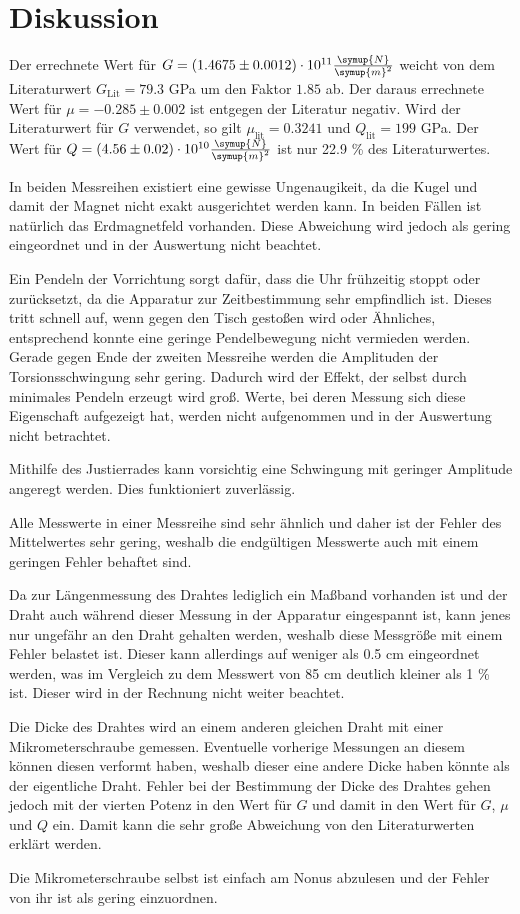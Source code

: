 \section{Diskussion}
\label{sec:Diskussion}

Der errechnete Wert für $G = (1.4675 \pm 0.0012) \cdot 10^{11} \frac{\symup{N}}{\symup{m}^2}$ weicht von dem Literaturwert $G_\text{Lit} = 79.3$ GPa \cite{G-stahl} um den Faktor $1.85$ ab.
Der daraus errechnete Wert für $\mu = -0.285 \pm 0.002$ ist entgegen der Literatur negativ.
Wird der Literaturwert für $G$ verwendet, so gilt $\mu_\text{lit} = 0.3241$ und $Q_\text{lit} = 199$ GPa.
Der Wert für $Q = (4.56 \pm 0.02) \cdot 10^{10} \frac{\symup{N}}{\symup{m}^2}$ ist nur 22.9 \% des Literaturwertes.

In beiden Messreihen existiert eine gewisse Ungenaugikeit, da die Kugel und damit der Magnet nicht exakt ausgerichtet werden kann.
In beiden Fällen ist natürlich das Erdmagnetfeld vorhanden. Diese Abweichung wird jedoch als gering eingeordnet und in der Auswertung nicht beachtet.

Ein Pendeln der Vorrichtung sorgt dafür, dass die Uhr frühzeitig stoppt oder zurücksetzt, da die Apparatur zur Zeitbestimmung sehr empfindlich ist. Dieses tritt schnell auf, wenn gegen den Tisch gestoßen wird oder Ähnliches, entsprechend konnte eine geringe Pendelbewegung nicht vermieden werden.
Gerade gegen Ende der zweiten Messreihe werden die Amplituden der Torsionsschwingung sehr gering. Dadurch wird der Effekt, der selbst durch minimales Pendeln erzeugt wird groß.
Werte, bei deren Messung sich diese Eigenschaft aufgezeigt hat, werden nicht aufgenommen und in der Auswertung nicht betrachtet.

Mithilfe des Justierrades kann vorsichtig eine Schwingung mit geringer Amplitude angeregt werden. Dies funktioniert zuverlässig.

Alle Messwerte in einer Messreihe sind sehr ähnlich und daher ist der Fehler des Mittelwertes sehr gering, weshalb die endgültigen Messwerte auch mit einem geringen Fehler behaftet sind.

Da zur Längenmessung des Drahtes lediglich ein Maßband vorhanden ist und der Draht auch während dieser Messung in der Apparatur eingespannt ist, kann jenes nur ungefähr an den Draht gehalten werden, weshalb diese Messgröße mit einem Fehler belastet ist.
Dieser kann allerdings auf weniger als 0.5 cm eingeordnet werden, was im Vergleich zu dem Messwert von 85 cm deutlich kleiner als 1 \% ist. Dieser wird in der Rechnung nicht weiter beachtet.

Die Dicke des Drahtes wird an einem anderen gleichen Draht mit einer Mikrometerschraube gemessen. 
Eventuelle vorherige Messungen an diesem können diesen verformt haben, weshalb dieser eine andere Dicke haben könnte als der eigentliche Draht.
Fehler bei der Bestimmung der Dicke des Drahtes gehen jedoch mit der vierten Potenz in den Wert für $G$ und damit in den Wert für $G$, $\mu$ und $Q$ ein.
Damit kann die sehr große Abweichung von den Literaturwerten erklärt werden.

Die Mikrometerschraube selbst ist einfach am Nonus abzulesen und der Fehler von ihr ist als gering einzuordnen.
